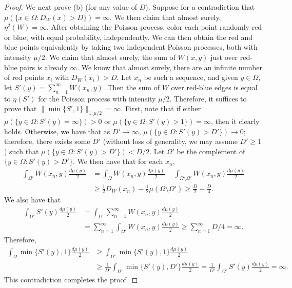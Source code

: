 \documentclass{amsart}
\numberwithin{equation}{section}
\numberwithin{figure}{section}
\theoremstyle{definition}
\theoremstyle{remark}
\begin{document}
\begin{proof}
We next prove (b) (for any value of $D$). Suppose for a contradiction that
$\mu(\{x \in \Omega:D_W(x)>D\})=\infty$. We then claim that almost surely,
$\eta^2(W)=\infty$. After obtaining the Poisson process, color each point
randomly red or blue, with equal probability, independently. We can then
obtain the red and blue points equivalently by taking two independent Poisson
processes, both with intensity $\mu/2$. We claim that almost surely, the sum
of $W(x,y)$ just over red-blue pairs is already $\infty$. We know that almost
surely, there are an infinite number of red points $x_i$ with $D_W(x_i)>D$.
Let $x_n$ be such a sequence, and given $y \in \Omega$, let
$S'(y)=\sum_{n=1}^\infty W(x_n,y)$. Then the sum of $W$ over red-blue edges
is equal to $\eta(S')$ for the Poisson process with intensity $\mu/2$.
Therefore, it suffices to prove that $\|\min\{S',1\}\|_{1,\mu/2}=\infty$.
First, note that if either $\mu(\{y \in \Omega:S'(y)=\infty\})>0$ or $\mu(\{y
\in \Omega:S'(y)>1\})=\infty$, then it clearly holds. Otherwise, we have that
as $D' \to \infty$, $\mu(\{y \in \Omega:S'(y)>D'\}) \to 0$; therefore, there
exists some $D'$ (without loss of generality, we may assume $D'\geq1$) such
that $\mu(\{y \in \Omega:S'(y)>D'\})<D/2$. Let $\Omega'$ be the complement of
$\{y \in \Omega:S'(y)>D'\}$. We then have that for each $x_n$,
\begin{align*}
\int_{\Omega'} W(x_n,y) \frac{d\mu(y)}{2}
&= \int_{\Omega} W(x_n,y) \frac{d\mu(y)}{2}-\int_{\Omega \setminus\Omega'} W(x_n,y) \frac{d\mu(y)}{2}\\
&\geq\frac 12 D_W(x_n) - \frac 12\mu(\Omega \setminus\Omega')
\ge \frac D2 - \frac D4.
\end{align*}
We also have that
\begin{align*}
\int_{\Omega'} S'(y)\frac{d\mu(y)}{2} &=\int_{\Omega'} \sum_{n=1}^\infty W(x_n,y) \frac{d\mu(y)}{2} \\
&= \sum_{n=1}^\infty\int_{\Omega'} W(x_n,y) \frac{d\mu(y)}{2}
 \ge \sum_{n=1}^{\infty} D/4= \infty.
\end{align*}
Therefore,
\begin{align*}
\int_\Omega \min\{S'(y),1\} \frac{d\mu(y)}{2}
&\ge \int_{\Omega'} \min\{S'(y),1\} \frac{d\mu(y)}{2}\\
&\ge
\frac 1{D'} \int_{\Omega'} \min\{S'(y),D'\} \frac{d\mu(y)}{2}
=\frac 1{D'} \int_{\Omega'} S'(y) \frac{d\mu(y)}{2}=\infty
.
\end{align*}
This contradiction completes the proof.


\end{proof}
\end{document}
